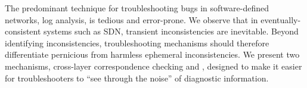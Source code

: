 The predominant technique for troubleshooting bugs in software-defined networks,
log analysis, is tedious and error-prone. We observe that
in eventually-consistent systems such as SDN,
transient inconsistencies are inevitable. Beyond identifying inconsistencies,
troubleshooting mechanisms should therefore differentiate
pernicious from harmless ephemeral inconsistencies. We present two
mechanisms, cross-layer correspondence checking and \simulator,
designed to make it easier for troubleshooters to ``see through the noise'' of
diagnostic information.

